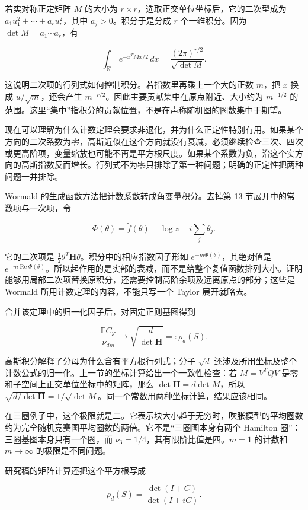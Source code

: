 \documentclass[11pt,a4paper]{article}
\begin{document}
若实对称正定矩阵 \(M\) 的大小为 \(r\times r\)，选取正交单位坐标后，它的二次型成为 \(a_1u_1^2+\cdots+a_ru_r^2\)，其中 \(a_j>0\)。积分于是分成 \(r\) 个一维积分。因为 \(\det M=a_1\cdots a_r\)，有

\[\int_{\mathbb R^r}e^{-x^TMx/2}\,dx
=\frac{(2\pi)^{r/2}}{\sqrt{\det M}}.\]

这说明二次项的行列式如何控制积分。若指数里再乘上一个大的正数 \(m\)，把 \(x\) 换成 \(u/\sqrt m\)，还会产生 \(m^{-r/2}\)。因此主要贡献集中在原点附近、大小约为 \(m^{-1/2}\) 的范围。这里``集中''指积分的贡献位置，不是在声称随机图的圈数集中于期望。

现在可以理解为什么计数定理会要求非退化，并为什么正定性特别有用。如果某个方向的二次系数为零，高斯近似在这个方向就没有衰减，必须继续检查三次、四次或更高阶项，变量缩放也可能不再是平方根尺度。如果某个系数为负，沿这个实方向的高斯指数反而增长。行列式不为零只排除了第一种问题；明确的正定性把两种问题一并排除。

Wormald 的生成函数方法把计数系数转成角变量积分。去掉第 13 节展开中的常数项与一次项，令

\[\Phi(\theta)=\widetilde f(\theta)-\log z
+i\sum_j\theta_j.\]

它的二次项是 \(\tfrac12\theta^T\mathbf H\theta\)。积分中的相应指数因子形如 \(e^{-m\Phi(\theta)}\)，其绝对值是 \(e^{-m\operatorname{Re}\Phi(\theta)}\)。所以起作用的是实部的衰减，而不是给整个复值函数排列大小。证明能够用局部二次项替换原积分，还需要控制高阶余项及远离原点的部分；这些是 Wormald 所用计数定理的内容，不能只写一个 Taylor 展开就略去。

合并该定理中的归一化因子后，对固定正则基图得到

\[\frac{\mathbb EC_{\mathcal T}}{\nu_{dm}}
\longrightarrow\sqrt{\frac d{\det\mathbf H}}
=:\rho_d(S).\]

高斯积分解释了分母为什么含有平方根行列式；分子 \(\sqrt d\) 还涉及所用坐标及整个计数公式的归一化。上一节的坐标计算给出一个一致性检查：若 \(M=V^TQV\) 是零和子空间上正交单位坐标中的矩阵，那么 \(\det\mathbf H=d\det M\)，所以 \(\sqrt{d/\det\mathbf H}=1/\sqrt{\det M}\)。同一个常数用两种坐标计算，结果应该相同。

在三圈例子中，这个极限就是二。它表示块大小趋于无穷时，吹胀模型的平均圈数约为完全随机竞赛图平均圈数的两倍。它不是``三圈图本身有两个 Hamilton 圈''：三圈基图本身只有一个圈，而 \(\nu_3=1/4\)，其有限阶比值是四。\(m=1\) 的计数和 \(m\to\infty\) 的极限是不同问题。

研究稿的矩阵计算还把这个平方根写成

\[\rho_d(S)=\frac{\det(I+C)}{\det(I+iC)}.\]
\end{document}
